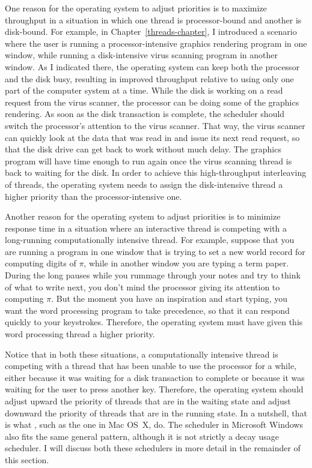 One reason for the operating system to adjust priorities is to
maximize throughput in a situation in which one thread is
processor-bound and another is disk-bound.  For example, in
Chapter~\ref{threads-chapter}, I introduced a scenario where the user is running a
processor-intensive graphics rendering program in one window, while
running a disk-intensive virus scanning program in another window.  As
I indicated there, the operating system can keep both the processor
and the disk busy, resulting in improved throughput relative to using
only one part of the computer system at a time.  While the disk is
working on a read request from the virus scanner, the processor can be
doing some of the graphics rendering.  As soon as the disk transaction
is complete, the scheduler should switch the processor's attention to
the virus scanner.  That way, the virus scanner can quickly look at
the data that was read in and issue its next read request, so that the
disk drive can get back to work without much delay.  The graphics
program will have time enough to run again once the virus scanning
thread is back to waiting for the disk.  In order to achieve this
high-throughput interleaving of threads, the operating system needs to
assign the disk-intensive thread a higher priority than the
processor-intensive one.

Another reason for the operating system to adjust priorities is to
minimize response time in a situation where an interactive thread is
competing with a long-running computationally intensive thread.  For
example, suppose that you are running a program in one window that is
trying to set a new world record for computing digits of $\pi$, while in
another window you are typing a term paper.  During the long pauses
while you rummage through your notes and try to think of what to write
next, you don't mind the processor giving its attention to computing
$\pi$.  But the moment you have an inspiration and start typing, you want
the word processing program to take precedence, so that it can respond
quickly to your keystrokes.  Therefore, the operating system must have
given this word processing thread a higher priority.

Notice that in both these situations, a computationally intensive
thread is competing with a thread that has been unable to use the
processor for a while, either because it was waiting for a disk
transaction to complete or because it was waiting for the user to
press another key.  Therefore, the operating system should adjust
upward the priority of threads that are in the waiting state and
adjust downward the priority of threads that are in the running state.  In a
nutshell, that is what , such as the one in Mac
OS~X, do.  The scheduler in Microsoft Windows also fits the same
general pattern, although it is not strictly a  decay usage
scheduler.  I will discuss both these schedulers in more detail in the
remainder of this section.

